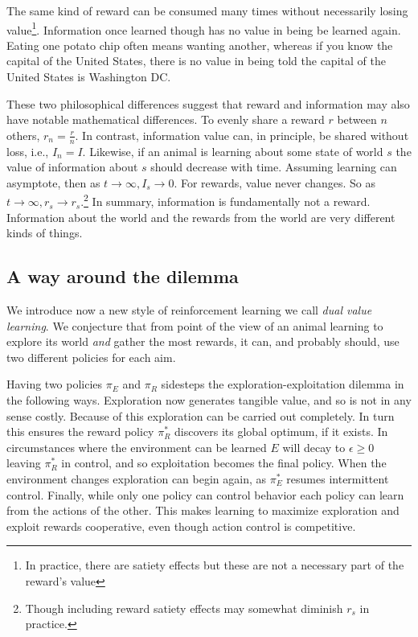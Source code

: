 \documentclass[9pt,twocolumn,twoside]{pnas-new}
\begin{document}
The same kind of reward can be consumed many times without necessarily losing value\footnote{In practice, there are satiety effects but these are not a necessary part of the reward's value}. Information once learned though has no value in being be learned again. Eating one potato chip often means wanting another, whereas if you know the capital of the United States, there is no value in being told the capital of the United States is Washington DC.

These two philosophical differences suggest that reward and information may also have notable mathematical differences. To evenly share a reward $r$ between $n$ others, $r_n = \frac{r}{n}$. In contrast, information value can, in principle, be shared without loss, i.e., $I_n = I$. Likewise, if an animal is learning about some state of world $s$ the value of information about $s$ should decrease with time. Assuming learning can asymptote, then as $t \rightarrow \infty, I_s \rightarrow 0$. For rewards, value never changes. So as $t \rightarrow \infty, r_s \rightarrow r_s$.\footnote{Though including reward satiety effects may somewhat diminish $r_s$ in practice.} In summary, information is fundamentally not a reward. Information about the world and the rewards from the world are very different kinds of things.

\subsection*{A way around the dilemma}
We introduce now a new style of reinforcement learning we call \textit{dual value learning}. We conjecture that from point of the view of an animal learning to explore its world \textit{and} gather the most rewards, it can, and probably should, use two different policies for each aim. 

Having two policies $\pi_E$ and $\pi_R$ sidesteps the exploration-exploitation dilemma in the following ways. Exploration now generates tangible value, and so is not in any sense costly. Because of this exploration can be carried out completely. In turn this ensures the reward policy $\pi^*_R$ discovers its global optimum, if it exists. In circumstances where the environment can be learned $E$ will decay to $\epsilon \geq 0$ leaving $\pi^*_R$ in control, and so exploitation becomes the final policy. When the environment changes exploration can begin again, as $\pi^*_E$ resumes intermittent control. Finally, while only one policy can control behavior each policy can learn from the actions of the other. This makes learning to maximize exploration and exploit rewards cooperative, even though action control is competitive. 
\end{document}
